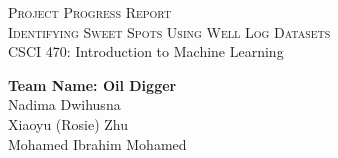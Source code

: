 \documentclass[11pt, a4paper]{article}
\begin{document}
    \begin{titlepage}
        \begin{center}
            \vspace*{2in}
            {\Large \textsc{Project Progress Report}}\\
            \vspace*{0.1in}
 	{\Large \textsc{Identifying Sweet Spots Using Well Log Datasets}}\\
            \vspace*{0.1in}
            CSCI 470: Introduction to Machine Learning\\
            \vspace*{0.1in}
            \date{\today}
            
            \vspace*{3in}
            \large{\textbf{Team Name: Oil Digger}} \\
            \vspace*{0.1in}
            \large{Nadima Dwihusna} \\
            \vspace*{0.1in}
            \large{Xiaoyu (Rosie) Zhu} \\
            \vspace*{0.1in}
            \large{Mohamed Ibrahim Mohamed} \\
        \end{center}
    \end{titlepage}
    
\end{document}

